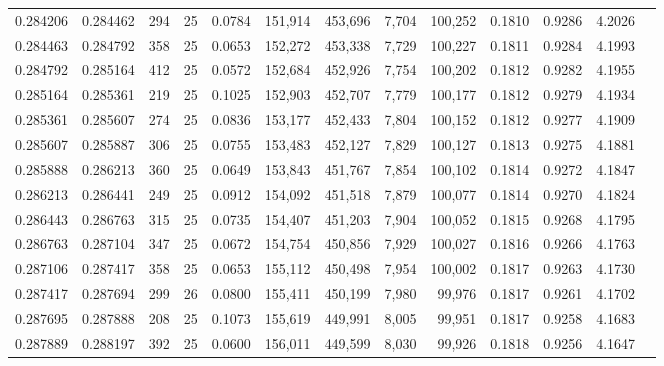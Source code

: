\begin{tabular}{rrrrrrrrrrrrr}
0.284206 & 0.284462 &   294 &  25 &                                     0.0784 & 151,914 & 453,696 &   7,704 & 100,252 & 0.1810 & 0.9286 & 4.2026 \\
0.284463 & 0.284792 &   358 &  25 &                                     0.0653 & 152,272 & 453,338 &   7,729 & 100,227 & 0.1811 & 0.9284 & 4.1993 \\
0.284792 & 0.285164 &   412 &  25 &                                     0.0572 & 152,684 & 452,926 &   7,754 & 100,202 & 0.1812 & 0.9282 & 4.1955 \\
0.285164 & 0.285361 &   219 &  25 &                                     0.1025 & 152,903 & 452,707 &   7,779 & 100,177 & 0.1812 & 0.9279 & 4.1934 \\
0.285361 & 0.285607 &   274 &  25 &                                     0.0836 & 153,177 & 452,433 &   7,804 & 100,152 & 0.1812 & 0.9277 & 4.1909 \\
0.285607 & 0.285887 &   306 &  25 &                                     0.0755 & 153,483 & 452,127 &   7,829 & 100,127 & 0.1813 & 0.9275 & 4.1881 \\
0.285888 & 0.286213 &   360 &  25 &                                     0.0649 & 153,843 & 451,767 &   7,854 & 100,102 & 0.1814 & 0.9272 & 4.1847 \\
0.286213 & 0.286441 &   249 &  25 &                                     0.0912 & 154,092 & 451,518 &   7,879 & 100,077 & 0.1814 & 0.9270 & 4.1824 \\
0.286443 & 0.286763 &   315 &  25 &                                     0.0735 & 154,407 & 451,203 &   7,904 & 100,052 & 0.1815 & 0.9268 & 4.1795 \\
0.286763 & 0.287104 &   347 &  25 &                                     0.0672 & 154,754 & 450,856 &   7,929 & 100,027 & 0.1816 & 0.9266 & 4.1763 \\
0.287106 & 0.287417 &   358 &  25 &                                     0.0653 & 155,112 & 450,498 &   7,954 & 100,002 & 0.1817 & 0.9263 & 4.1730 \\
0.287417 & 0.287694 &   299 &  26 &                                     0.0800 & 155,411 & 450,199 &   7,980 &  99,976 & 0.1817 & 0.9261 & 4.1702 \\
0.287695 & 0.287888 &   208 &  25 &                                     0.1073 & 155,619 & 449,991 &   8,005 &  99,951 & 0.1817 & 0.9258 & 4.1683 \\
0.287889 & 0.288197 &   392 &  25 &                                     0.0600 & 156,011 & 449,599 &   8,030 &  99,926 & 0.1818 & 0.9256 & 4.1647 \\

\end{tabular}
